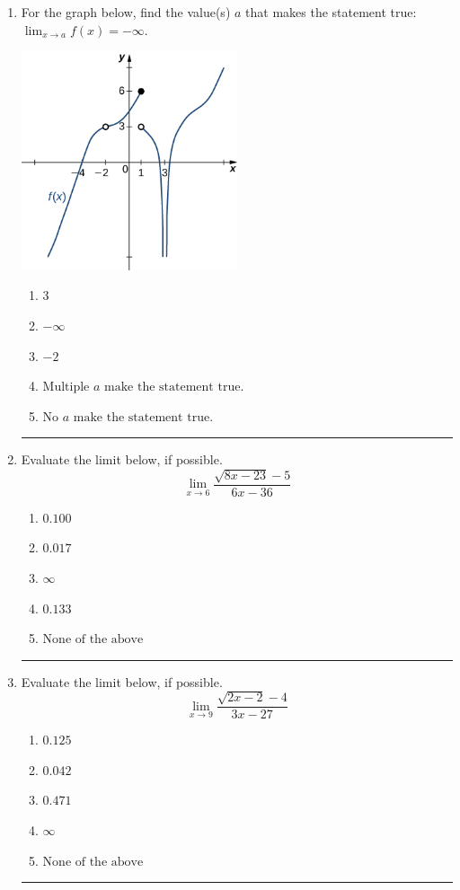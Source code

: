 \documentclass[14pt]{extbook}
\newcommand{\litem}[1]{\item#1\hspace*{-1cm}\rule{\textwidth}{0.4pt}}
\begin{document}
\begin{enumerate}
{\begin{enumerate}[label=\Alph*.]
\end{enumerate} }
\litem{
For the graph below, find the value(s) $a$ that makes the statement true: $ \displaystyle \lim_{x \rightarrow a} f(x) = -\infty$.
\begin{center}
    \includegraphics[width=0.5\textwidth]{../Figures/evaluateLimitGraphicallyCopyA.png}
\end{center}
\begin{enumerate}[label=\Alph*.]
\item \( 3 \)
\item \( -\infty \)
\item \( -2 \)
\item \( \text{Multiple } a \text{ make the statement true}. \)
\item \( \text{No } a \text{ make the statement true}. \)

\end{enumerate} }
\litem{
Evaluate the limit below, if possible.\[ \lim_{x \rightarrow 6} \frac{\sqrt{8x - 23} - 5}{6x - 36} \]\begin{enumerate}[label=\Alph*.]
\item \( 0.100 \)
\item \( 0.017 \)
\item \( \infty \)
\item \( 0.133 \)
\item \( \text{None of the above} \)

\end{enumerate} }
\litem{
Evaluate the limit below, if possible.\[ \lim_{x \rightarrow 9} \frac{\sqrt{2x - 2} - 4}{3x - 27} \]\begin{enumerate}[label=\Alph*.]
\item \( 0.125 \)
\item \( 0.042 \)
\item \( 0.471 \)
\item \( \infty \)
\item \( \text{None of the above} \)


\end{enumerate}}
\end{enumerate}
\end{document}
